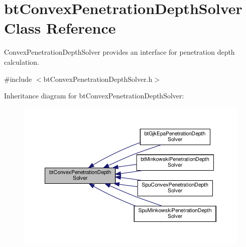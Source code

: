 \hypertarget{classbtConvexPenetrationDepthSolver}{}\section{bt\+Convex\+Penetration\+Depth\+Solver Class Reference}
\label{classbtConvexPenetrationDepthSolver}


Convex\+Penetration\+Depth\+Solver provides an interface for penetration depth calculation.  




{\ttfamily \#include $<$bt\+Convex\+Penetration\+Depth\+Solver.\+h$>$}



Inheritance diagram for bt\+Convex\+Penetration\+Depth\+Solver\+:
\nopagebreak
\begin{figure}[H]
\begin{center}
\leavevmode
\includegraphics[width=350pt]{classbtConvexPenetrationDepthSolver__inherit__graph}
\end{center}
\end{figure}
